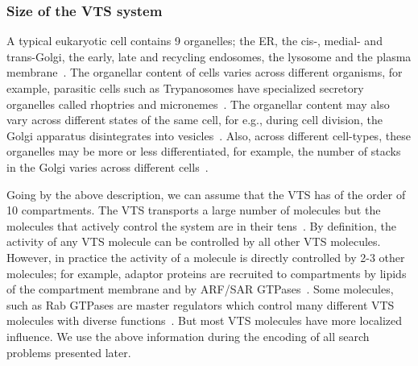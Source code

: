 \subsubsection{Size of the VTS system}
A typical eukaryotic cell contains 9 organelles; the ER, the cis-, medial- and trans-Golgi, the early, late and recycling endosomes, the lysosome and the plasma membrane~\cite{lodish2008molecular}. 
%
The organellar content of cells varies across different organisms, for example, parasitic cells such as Trypanosomes have specialized secretory organelles called rhoptries and micronemes~\cite{gubbels2012evolution}. 
%
The organellar content may also vary across different states of the same cell, for e.g., during cell division, the Golgi apparatus disintegrates into vesicles~\cite{tang2013cell}. 
%
Also, across different cell-types, these organelles may be more or less differentiated, for example, the number of stacks in the Golgi varies across different cells~\cite{polishchuk2004structural}. 
%

Going by the above description, we can assume that the VTS has of the order of 10 compartments. 
%
The VTS transports a large number of molecules but the molecules that actively control the system are in their tens~\cite{lodish2008molecular}. 
%
By definition, the activity of any VTS molecule can be controlled by all other VTS molecules.
%
However, in practice the activity of a molecule is directly controlled by 2-3 other molecules; for example, adaptor proteins are recruited to compartments by lipids of the compartment membrane and by ARF/SAR GTPases~\cite{kahn2009toward}. 
%
Some molecules, such as Rab GTPases are master regulators which control many different VTS molecules with diverse functions~\cite{zerial2001rab}. 
%
But most VTS molecules have more localized influence.
%
We use the above information during the encoding of all search problems presented later.

